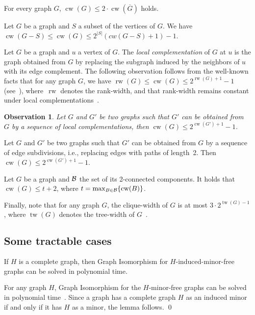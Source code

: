 \documentclass[envcountsame,envcountsect,11pt,a4paper]{llncs}
\renewenvironment{proof}{\begin{Proof}}{\qed\end{Proof}}
\newtheorem{observation}[theorem]{Observation}
\DeclareMathOperator{\cw}{cw}
\DeclareMathOperator{\tw}{tw}
\DeclareMathOperator{\rw}{rw}
\begin{document}
\begin{theorem}
\label{thm:cw-complement}
For every graph $G$, $\cw(G) \leq 2\cdot \cw(\overline{G})$ holds.
\end{theorem}

\begin{theorem}
\label{thm:cw-vertex-deletion}
Let $G$ be a graph and $S$ a subset of the vertices of $G$. We have $\cw(G - S)\leq \cw(G) \leq 2^{|S|}(cw(G - S)+1) -1$.
\end{theorem}

Let $G$ be a graph and $u$ a vertex of $G$. The {\em local complementation} of $G$ at $u$ is the graph obtained from $G$ by replacing the subgraph induced by the neighbors of $u$ with its edge complement. The following observation follows from the well-known facts that for any graph $G$, we have $\rw(G) \le \cw(G) \leq 2^{\rw(G)+1}-1$ (see~\cite{OS06}), where~$\rw$ denotes the rank-width,  and that rank-width remains constant under local complementations~\cite{Oum05}.

\begin{observation}
\label{obs:cw-local-complementation}
Let $G$ and $G'$ be two graphs such that $G'$ can be obtained from $G$ by a sequence of local complementations, then $\cw(G) \leq 2^{\cw(G')+1}-1$.
\end{observation}

\begin{theorem}
\label{thm:cw-subdivision}
Let $G$ and $G'$ be two graphs such that $G'$ can be obtained from $G$ by a sequence of edge subdivisions, i.e., replacing edges with paths of length~2. Then $\cw(G) \leq 2^{\cw(G')+1}-1$.
\end{theorem}

\begin{theorem}
\label{thm:cw-blocks}
Let $G$ be a graph and $\cal{B}$ the set of its 2-connected components. It holds that $\cw(G)\leq t + 2$, where $t=\max_{B\in\cal{B}}\{\cw(B)\}$.
\end{theorem}

Finally, note that for any graph $G$, the clique-width of $G$ is at most $3\cdot 2^{\tw(G)-1}$, where $\tw(G)$ denotes the tree-width of $G$~\cite{CR05}.

\subsection{Some tractable cases}
\begin{lemma}
If $H$ is a complete graph,
then {\sc Graph Isomorphism} for $H$-induced-minor-free graphs can be solved in polynomial time.
\end{lemma}
\begin{proof}
For any graph $H$,
{\sc Graph Isomorphism} for the $H$-minor-free graphs can be solved in polynomial time~\cite{Ponomarenko88}.
Since a graph has a complete graph $H$ as an induced minor
if and only if it has $H$ as a minor, the lemma follows.
\end{proof}
\end{document}
